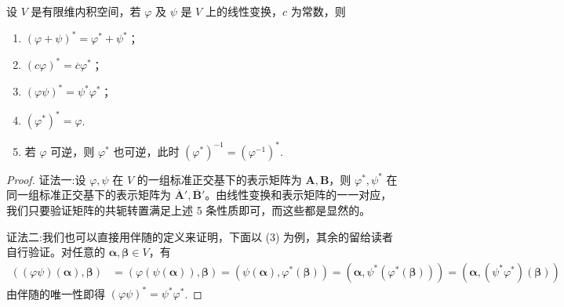 \documentclass[../../main.tex]{subfiles}%
\begin{document}
\begin{theorem}[伴随算子的性质]\label{theorem:伴随算子的性质}
设 $V$ 是有限维内积空间，若 $\varphi$ 及 $\psi$ 是 $V$ 上的线性变换，$c$ 为常数，则
\begin{enumerate}[(1)]
\item $(\varphi + \psi)^* = \varphi^* + \psi^*$；

\item $(c\varphi)^* = \overline{c}\varphi^*$；

\item $(\varphi\psi)^* = \psi^*\varphi^*$；

\item $(\varphi^*)^* = \varphi$.

\item 若 \(\varphi\) 可逆，则 \(\varphi^*\) 也可逆，此时 \((\varphi^*)^{-1}=(\varphi^{-1})^*\). 
\end{enumerate} 
\end{theorem}
\begin{proof}

{\color{blue}证法一:}设 $\varphi, \psi$ 在 $V$ 的一组标准正交基下的表示矩阵为 $\boldsymbol{A}, \boldsymbol{B}$，则 $\varphi^*, \psi^*$ 在同一组标准正交基下的表示矩阵为 $\overline{\boldsymbol{A}}', \overline{\boldsymbol{B}}'$。由线性变换和表示矩阵的一一对应，我们只要验证矩阵的共轭转置满足上述 5 条性质即可，而这些都是显然的。

{\color{blue}证法二:}我们也可以直接用伴随的定义来证明，下面以 (3) 为例，其余的留给读者自行验证。对任意的 $\boldsymbol{\alpha}, \boldsymbol{\beta} \in V$，有
\begin{align*}
((\varphi\psi)(\boldsymbol{\alpha}), \boldsymbol{\beta}) &= (\varphi(\psi(\boldsymbol{\alpha})), \boldsymbol{\beta}) = (\psi(\boldsymbol{\alpha}), \varphi^*(\boldsymbol{\beta})) = (\boldsymbol{\alpha}, \psi^*(\varphi^*(\boldsymbol{\beta}))) = (\boldsymbol{\alpha}, (\psi^*\varphi^*)(\boldsymbol{\beta}))
\end{align*}
由伴随的唯一性即得 $(\varphi\psi)^* = \psi^*\varphi^*$.
\end{proof}
\end{document}
